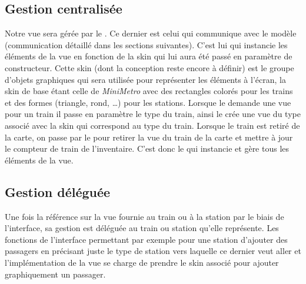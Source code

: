 \documentclass[report, backcover, french, nodocumentinfo]{upmethodology-document}
\begin{document}
			\subsection{Gestion centralisée}
				Notre vue sera gérée par le . Ce dernier est celui qui communique avec le modèle (communication détaillé dans les sections suivantes). C'est lui qui instancie les éléments de la vue en fonction de la skin qui lui aura été passé en paramètre de constructeur. Cette skin (dont la conception reste encore à définir) est le groupe d'objets graphiques qui sera utilisée pour représenter les éléments à l'écran, la skin de base étant celle de \textit{MiniMetro} avec des rectangles colorés pour les trains et des formes (triangle, rond, \ldots) pour les stations. Lorsque le  demande une vue pour un train il passe en paramètre le type du train, ainsi le  crée une vue du type associé avec la skin qui correspond au type du train. Lorsque le train est retiré de la carte, on passe par le  pour retirer la vue du train de la carte et mettre à jour le compteur de train de l'inventaire. C'est donc le  qui instancie et gère tous les éléments de la vue.
			\subsection{Gestion déléguée}
				Une fois la référence sur la vue fournie au train ou à la station par le biais de l'interface, sa gestion est déléguée au train ou station qu'elle représente. Les fonctions de l'interface permettant par exemple pour une station d'ajouter des passagers en précisant juste le type de station vers laquelle ce dernier veut aller et l'implémentation de la vue se charge de prendre le skin associé pour ajouter graphiquement un passager.
\end{document}
